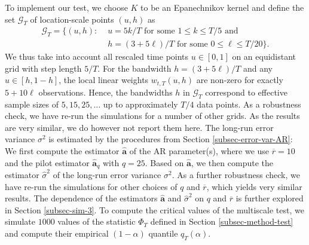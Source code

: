 To implement our test, we choose $K$ to be an Epanechnikov kernel and define the set $\mathcal{G}_T$ of location-scale points $(u,h)$ as
\begin{align}
\mathcal{G}_T = \big\{ (u, h): & \, \, u = 5k/T \text{ for some } 1 \le k \le T/5 \text{ and } \nonumber \\ & \, \, h = (3+5\ell)/T \text{ for some } 0 \le \ell \le T/20 \big\}. \label{grid-sim-app}
\end{align}
We thus take into account all rescaled time points $u \in [0,1]$ on an equidistant grid with step length $5/T$. For the bandwidth $h = (3 + 5\ell)/T$ and any $u \in [h,1-h]$, the local linear weights $w_{t,T}(u,h)$ are non-zero for exactly $5 + 10 \ell$ observations. Hence, the bandwidths $h$ in $\mathcal{G}_T$ correspond to effective sample sizes of $5, 15, 25, \ldots$ up to approximately $T/4$ data points. As a robustness check, we have re-run the simulations for a number of other grids. As the results are very similar, we do however not report them here. The long-run error variance $\sigma^2$ is estimated by the procedures from Section \ref{subsec-error-var-AR}: We first compute the estimator $\widehat{\boldsymbol{a}}$ of the AR parameter(s), where we use $\overline{r} = 10$ and the pilot estimator $\widehat{\boldsymbol{a}}_q$ with $q = 25$. Based on $\widehat{\boldsymbol{a}}$, we then compute the estimator $\widehat{\sigma}^2$ of the long-run error variance $\sigma^2$. As a further robustness check, we have re-run the simulations for other choices of $q$ and $\overline{r}$, which yields very similar results. The dependence of the estimators $\widehat{\boldsymbol{a}}$ and $\widehat{\sigma}^2$ on $q$ and $\overline{r}$ is further explored in Section \ref{subsec-sim-3}. To compute the critical values of the multiscale test, we simulate $1000$ values of the statistic $\Phi_T$ defined in Section \ref{subsec-method-test} and compute their empirical $(1-\alpha)$ quantile $q_T(\alpha)$. 


